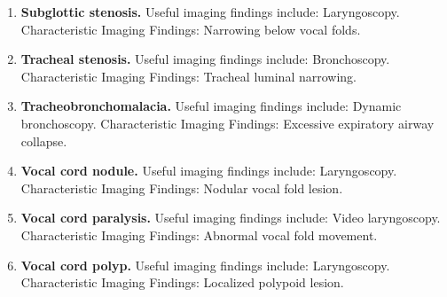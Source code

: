 \begin{enumerate}[leftmargin=*,itemsep=0.45em,topsep=0.4em]
\item \textbf{Subglottic stenosis.} Useful imaging findings include: Laryngoscopy. Characteristic Imaging Findings: Narrowing below vocal folds.
\item \textbf{Tracheal stenosis.} Useful imaging findings include: Bronchoscopy. Characteristic Imaging Findings: Tracheal luminal narrowing.
\item \textbf{Tracheobronchomalacia.} Useful imaging findings include: Dynamic bronchoscopy. Characteristic Imaging Findings: Excessive expiratory airway collapse.
\item \textbf{Vocal cord nodule.} Useful imaging findings include: Laryngoscopy. Characteristic Imaging Findings: Nodular vocal fold lesion.
\item \textbf{Vocal cord paralysis.} Useful imaging findings include: Video laryngoscopy. Characteristic Imaging Findings: Abnormal vocal fold movement.
\item \textbf{Vocal cord polyp.} Useful imaging findings include: Laryngoscopy. Characteristic Imaging Findings: Localized polypoid lesion.
\end{enumerate}

